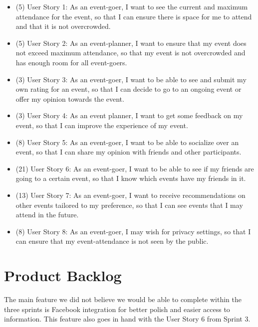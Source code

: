 \documentclass[10pt]{article}
\newcommand{\fancysecX}[2] {{\color{primary}\section*{#1} \label{sec:#2}}}
\begin{document}
        \begin{itemize}
            \item (5) User Story 1: As an event-goer, I want to see the current and maximum attendance for the event, so that I can ensure there is space for me to attend and that it is not overcrowded. 
            \item (5) User Story 2: As an event-planner, I want to ensure that my event does not exceed maximum attendance, so that my event is not overcrowded and has enough room for all event-goers.
            \item (3) User Story 3: As an event-goer, I want to be able to see and submit my own rating for an event, so that I can decide to go to an ongoing event or offer my opinion towards the event.
            \item (3) User Story 4: As an event planner, I want to get some feedback on my event, so that I can improve the experience of my event.
            \item (8) User Story 5: As an event-goer, I want to be able to socialize over an event, so that I can share my opinion with friends and other participants.
            \item (21) User Story 6: As an event-goer, I want to be able to see if my friends are going to a certain event, so that I know which events have my friends in it.
            \item (13) User Story 7: As an event-goer, I want to receive recommendations on other events tailored to my preference, so that I can see events that I may attend in the future.
            \item (8) User Story 8: As an event-goer, I may wish for privacy settings, so that I can ensure that my event-attendance is not seen by the public.
	\end{itemize}

\fancysecX{Product Backlog}{backlog}

    The main feature we did not believe we would be able to complete within the three sprints is Facebook integration for better polish and easier access to information. This feature also goes in hand with the User Story 6 from Sprint 3.
\end{document}
